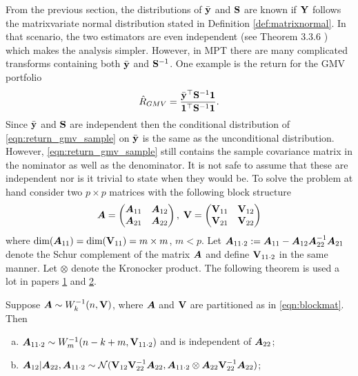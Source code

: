 \documentclass[12pt, oneside]{book}\usepackage{knitr}
\begin{document}
{From the previous section, the distributions of $\bar{\mathbf{y}}$ and $\mathbf{S}$ are known if $\mathbf{Y}$ follows the matrixvariate normal distribution stated in Definition \ref{def:matrixnormal}. 
In that scenario, the two estimators are even independent (see Theorem 3.3.6 \citet{GuptaNagar2000}) which makes the analysis simpler.
However, in MPT there are many complicated transforms containing both $\bar{\mathbf{y}}$ and $\mathbf{S}^{-1}$.
One example is the return for the GMV portfolio
\begin{equation}\label{eqn:return_gmv_sample}
\hat{R}_{GMV}=\frac{\bar{\mathbf{y}}^\top\mathbf{S}^{-1}\mathbf{1}}{\mathbf{1}^\top\mathbf{S}^{-1}\mathbf{1}}.
\end{equation}
Since $\bar{\mathbf{y}}$ and $\mathbf{S}$ are independent then the conditional distribution of \eqref{eqn:return_gmv_sample} on $\bar{\mathbf{y}}$ is the same as the unconditional distribution.
However, \eqref{eqn:return_gmv_sample} still contains the sample covariance matrix in the nominator as well as the denominator.
It is not safe to assume that these are independent nor is it trivial to state when they would be.
To solve the problem at hand consider two $p\times p$ matrices with the following block structure 
\begin{equation}\label{eqn:blockmat}
\mbox{\boldmath$A$} = \begin{pmatrix}
       \mbox{\boldmath$A$}_{11} & \mbox{\boldmath$A$}_{12} \\
       \mbox{\boldmath$A$}_{21} & \mbox{\boldmath$A$}_{22}
      \end{pmatrix},\;
\mathbf{V} = \begin{pmatrix}
           \mathbf{V}_{11} & \mathbf{V}_{12} \\
           \mathbf{V}_{21} & \mathbf{V}_{22}
          \end{pmatrix}
\end{equation}
where $\text{dim}(\mbox{\boldmath$A$}_{11}) = \text{dim}(\mathbf{V}_{11})= m \times m$, $m<p$. 
Let $\mbox{\boldmath$A$}_{11\cdot 2} := \mbox{\boldmath$A$}_{11} - \mbox{\boldmath$A$}_{12} \mbox{\boldmath$A$}_{22}^{-1} \mbox{\boldmath$A$}_{21}$ denote the Schur complement of the matrix $\mbox{\boldmath$A$}$ and define $\mathbf{V}_{11\cdot 2}$ in the same manner. 
Let $\otimes$ denote the Kronocker product. 
The following theorem is used a lot in papers \hyperref[sec:paper2]{1} and \hyperref[sec:paper2]{2}.
\begin{theorem}\label{thrm:invWis}
 Suppose $\mbox{\boldmath$A$} \sim W^{-1}_k(n, \mathbf{V})$, where $\mbox{\boldmath$A$}$ and $\mathbf{V}$ are partitioned as in \eqref{eqn:blockmat}. Then
 \begin{enumerate}[(a)]
	\item $\mbox{\boldmath$A$}_{11\cdot 2} \sim W^{-1}_m(n-k+m, \mathbf{V}_{11\cdot 2})$ and is independent of $\mbox{\boldmath$A$}_{22}$;
 	\item $\mbox{\boldmath$A$}_{12} | \mbox{\boldmath$A$}_{22}, \mbox{\boldmath$A$}_{11\cdot 2} \sim \mathcal{N}(\mathbf{V}_{12}\mathbf{V}^{-1}_{22} \mbox{\boldmath$A$}_{22}, \mbox{\boldmath$A$}_{11\cdot 2} \otimes \mbox{\boldmath$A$}_{22} \mathbf{V}^{-1}_{22} \mbox{\boldmath$A$}_{22})$;

\end{enumerate}
\end{theorem}}
\end{document}
